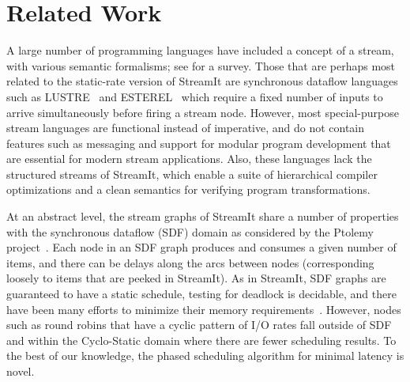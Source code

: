 \section{Related Work}
\label{sec:related}

A large number of programming languages have included a concept of a
stream, with various semantic formalisms; see \cite{survey97} for a
survey.  Those that are perhaps most related to the static-rate
version of StreamIt are synchronous dataflow languages such as
LUSTRE~\cite{lustre} and ESTEREL~\cite{esterel92} which require a
fixed number of inputs to arrive simultaneously before firing a stream
node.  However, most special-purpose stream languages are functional
instead of imperative, and do not contain features such as messaging
and support for modular program development that are essential for
modern stream applications.  Also, these languages lack the structured
streams of StreamIt, which enable a suite of hierarchical compiler
optimizations and a clean semantics for verifying program
transformations.

At an abstract level, the stream graphs of StreamIt share a number of
properties with the synchronous dataflow (SDF) domain as considered by
the Ptolemy project~\cite{ptolemyoverview}.  Each node in an SDF graph
produces and consumes a given number of items, and there can be delays
along the arcs between nodes (corresponding loosely to items that are
peeked in StreamIt). As in StreamIt, SDF graphs are guaranteed to have
a static schedule, testing for deadlock is decidable, and there have
been many efforts to minimize their memory requirements~\cite{leesdf,
murt2001x1, gov94, goddardmanaging}.  However, nodes such as round
robins that have a cyclic pattern of I/O rates fall outside of SDF and
within the Cyclo-Static domain \cite{lauwereins94geometric} where
there are fewer scheduling results.  To the best of our knowledge, the
phased scheduling algorithm for minimal latency is novel.